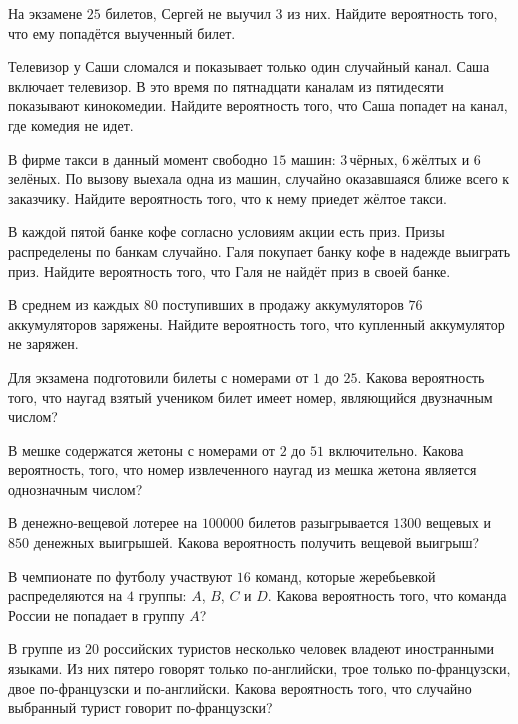 \begin{class}[number=3]
	\begin{listofex}
		\item На экзамене \( 25 \) билетов, Сергей не выучил \( 3 \) из них. Найдите вероятность того, что ему попадётся выученный билет.
		\item Телевизор у Саши сломался и показывает только один случайный канал. Саша включает телевизор. В это время по пятнадцати каналам из пятидесяти показывают кинокомедии. Найдите вероятность того, что Саша попадет на канал, где комедия не идет.
		\item В фирме такси в данный момент свободно \( 15 \) машин: \( 3 \) чёрных, \( 6 \) жёлтых и \( 6 \) зелёных. По вызову выехала одна из машин, случайно оказавшаяся ближе всего к заказчику. Найдите вероятность того, что к нему приедет жёлтое такси.
		\item В каждой пятой банке кофе согласно условиям акции есть приз. Призы распределены по банкам случайно. Галя покупает банку кофе в надежде выиграть приз. Найдите вероятность того, что Галя не найдёт приз в своей банке.
		\item В среднем из каждых \( 80 \) поступивших в продажу аккумуляторов \( 76 \) аккумуляторов заряжены. Найдите вероятность того, что купленный аккумулятор не заряжен.
		\item Для экзамена подготовили билеты с номерами от \( 1 \) до \( 25 \). Какова вероятность того, что наугад взятый учеником билет имеет номер, являющийся двузначным числом?
		\item В мешке содержатся жетоны с номерами от \( 2 \) до \( 51 \) включительно. Какова вероятность, того, что номер извлеченного наугад из мешка жетона является однозначным числом?
		\item В денежно-вещевой лотерее на \( 100000 \) билетов разыгрывается \( 1300 \) вещевых и \( 850 \) денежных выигрышей. Какова вероятность получить вещевой выигрыш?
		\item В чемпионате по футболу участвуют \( 16 \) команд, которые жеребьевкой распределяются на \( 4 \) группы: \( A \), \( B \), \( C \) и \( D \). Какова вероятность того, что команда России не попадает в группу \( A \)?
		\item В группе из \( 20 \) российских туристов несколько человек владеют иностранными языками. Из них пятеро говорят только по-английски, трое только по-французски, двое по-французски и по-английски. Какова вероятность того, что случайно выбранный турист говорит по-французски?

\end{listofex}
\end{class}
